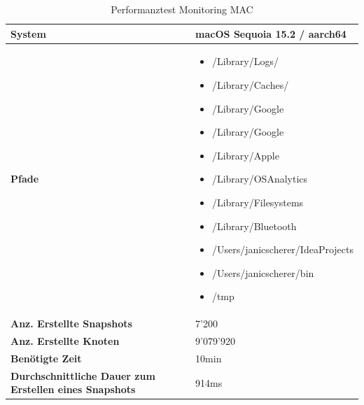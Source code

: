 \documentclass[a4paper,12pt]{report}
\begin{document}
    \begin{table}[h!]
        \centering
        \setlength{\leftmargini}{0.8cm}
        \begin{tabular}{|p{5cm}|p{10cm}|}
            \hline
            \textbf{System}                                                & macOS Sequoia 15.2 / aarch64 \\ \hline
            \textbf{Pfade} &
            \begin{itemize}
                \item /Library/Logs/
                \item /Library/Caches/
                \item /Library/Google
                \item /Library/Google
                \item /Library/Apple
                \item /Library/OSAnalytics
                \item /Library/Filesystems
                \item /Library/Bluetooth
                \item /Users/janicscherer/IdeaProjects
                \item /Users/janicscherer/bin
                \item /tmp
            \end{itemize}
            \\ \hline
            \textbf{Anz. Erstellte Snapshots}                              & 7'200                        \\ \hline
            \textbf{Anz. Erstellte Knoten}                                 & 9'079'920                    \\ \hline
            \textbf{Benötigte Zeit}                                        & 10min                        \\ \hline
            \textbf{Durchschnittliche Dauer zum Erstellen eines Snapshots} & 914ms                        \\ \hline
        \end{tabular}
        \caption{Performanztest Monitoring MAC}\label{tab:perf-monitoring-mac}
    \end{table}
\end{document}
